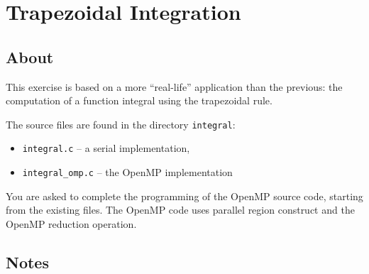 \documentclass[a4paper, 12pt]{article}
\def \cc   {\tt }               %
\begin{document}

\section{Trapezoidal Integration}
\label{integral}


\subsection*{About}

This exercise is based on a more ``real-life'' application than the
previous: the computation of a function integral using the trapezoidal
rule.

The source files are found in the directory {\cc integral}:
%
\begin{itemize}
  \item {\cc integral.c} -- a serial implementation,
  \item {\cc integral\_omp.c} -- the OpenMP implementation
\end{itemize}
%

You are asked to complete the programming of the OpenMP source
code, starting from the existing files. The OpenMP code uses parallel region
construct and the OpenMP reduction operation. 

\subsection*{Notes}
\end{document}
